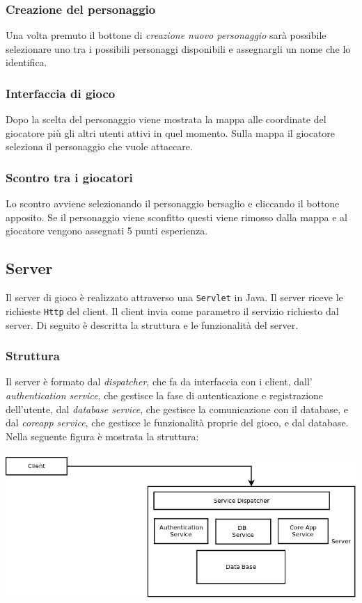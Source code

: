 \documentclass[12pt,a4]{article}
\begin{document}
\subsubsection{Creazione del personaggio}
Una volta premuto il bottone di \textit{creazione nuovo personaggio} sarà possibile selezionare uno tra i possibili personaggi disponibili e assegnargli un nome che lo identifica.

\subsubsection{Interfaccia di gioco}
Dopo la scelta del personaggio viene mostrata la mappa alle coordinate del giocatore più gli altri utenti attivi in quel momento. Sulla mappa il giocatore seleziona il personaggio che vuole attaccare.

\subsubsection{Scontro tra i giocatori}
Lo scontro avviene selezionando il personaggio bersaglio e cliccando il bottone apposito. Se il personaggio viene sconfitto questi viene rimosso dalla mappa e al giocatore vengono assegnati 5 punti esperienza.

\subsection{Server}
Il server di gioco è realizzato attraverso una \texttt{Servlet} in Java. Il server riceve le richieste \texttt{Http} del client. Il client invia come parametro il servizio richiesto dal server. Di seguito è descritta la struttura e le funzionalità del server.

\subsubsection{Struttura}
Il server è formato dal \textit{dispatcher}, che fa da interfaccia con i client, dall' \textit{authentication service}, che gestisce la fase di autenticazione e registrazione dell'utente, dal \textit{database service}, che gestisce la comunicazione con il database, e dal \textit{coreapp service}, che gestisce le funzionalità proprie del gioco, e dal database.
\newpage
Nella seguente figura è mostrata la struttura:\\
\\
\includegraphics[scale=0.3]{./Schema_Server.png} \\
\end{document}
